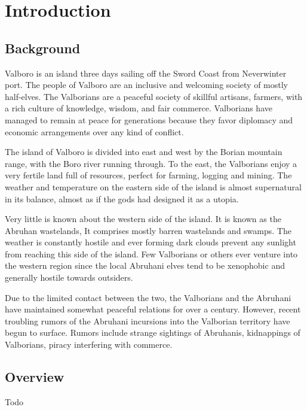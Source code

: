 \section*{Introduction}

\begin{multicols*}{2}
	\subsection*{Background}
	Valboro is an island three days sailing off the Sword Coast from Neverwinter port. The people of Valboro are an inclusive and welcoming society of mostly half-elves. The Valborians are a peaceful society of skillful artisans, farmers, with a rich culture of knowledge, wisdom, and fair commerce. Valborians have managed to remain at peace for generations because they favor diplomacy and economic arrangements over any kind of conflict.
	
	The island of Valboro is divided into east and west by the Borian mountain range, with the Boro river running through. To the east, the Valborians enjoy a very fertile land full of resources, perfect for farming, logging and mining. The weather and temperature on the eastern side of the island is almost supernatural in its balance, almost as if the gods had designed it as a utopia. 
	
	Very little is known about the western side of the island. It is known as the Abruhan wastelands, It comprises mostly barren wastelands and swamps. The weather is constantly hostile and ever forming dark clouds prevent any sunlight from reaching this side of the island. Few Valborians or others ever venture into the western region since the local Abruhani elves tend to be xenophobic and generally hostile towards outsiders.
	
	Due to the limited contact between the two, the Valborians and the Abruhani have maintained somewhat peaceful relations for over a century. However, recent troubling rumors of the Abruhani incursions into the Valborian territory have begun to surface. Rumors include strange sightings of Abruhanis, kidnappings of Valborians, piracy interfering with commerce.
	
	\subsection*{Overview}
	Todo
	

\end{multicols*}
